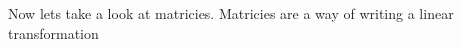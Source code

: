 \documentclass[preview]{standalone}
\begin{document}
\begin{minipage}
{8cm}Now lets take a look at matricies. Matricies are a way of writing a linear transformation
\end{minipage}
\end{document}
